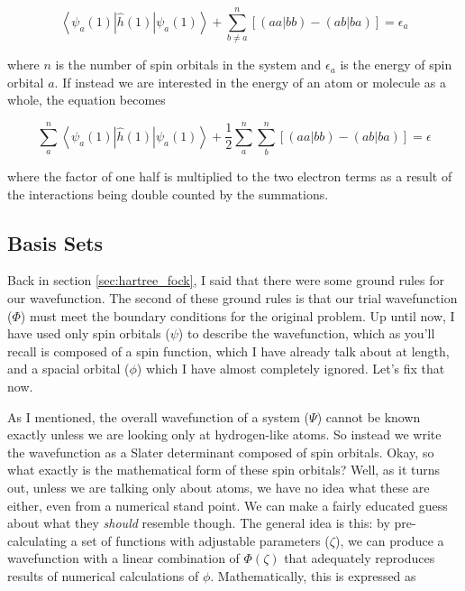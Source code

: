  \begin{equation}
\label{eq:hartree-fock_eq}
\left<\psi_{a}(1)|\hat{h}(1)|\psi_{a}(1)\right> + \sum^{n}_{b\neq a}\left[\left(aa|bb\right) - \left(ab|ba\right)\right] = \epsilon_{a}
\end{equation}

where $n$ is the number of spin orbitals in the system and $\epsilon_{a}$ is the energy of spin orbital $a$. If instead we are interested in the energy of an atom or molecule as a whole, the equation becomes

 \begin{equation}
\label{eq:hartree-fock_eq}
\sum_{a}^{n}\left<\psi_{a}(1)|\hat{h}(1)|\psi_{a}(1)\right> + \frac{1}{2}\sum^{n}_{a}\sum^{n}_{b}\left[\left(aa|bb\right) - \left(ab|ba\right)\right] = \epsilon
\end{equation}

where the factor of one half is multiplied to the two electron terms as a result of the interactions being double counted by the summations.

\subsection{Basis Sets}
\label{subsec:basis_sets}
Back in section \ref{sec:hartree_fock}, I said that there were some ground rules for our wavefunction. The second of these ground rules is that our trial wavefunction ($\Phi$) must meet the boundary conditions for the original problem. Up until now, I have used only spin orbitals ($\psi$) to describe the wavefunction, which as you'll recall is composed of a spin function, which I have already talk about at length, and a spacial orbital ($\phi$) which I have almost completely ignored. Let's fix that now. 

As I mentioned, the overall wavefunction of a system ($\Psi$) cannot be known exactly unless we are looking only at hydrogen-like atoms. So instead we write the wavefunction as a Slater determinant composed of spin orbitals. Okay, so what exactly is the mathematical form of these spin orbitals? Well, as it turns out, unless we are talking only about atoms, we have no idea what these are either, even from a numerical stand point. We can make a fairly educated guess about what they \textit{should} resemble though. The general idea is this: by pre-calculating a set of functions with adjustable parameters ($\zeta$), we can produce a wavefunction with a linear combination of $\Phi(\zeta)$ that adequately reproduces results of numerical calculations of $\phi$. Mathematically, this is expressed as\cite{Ostlund}

